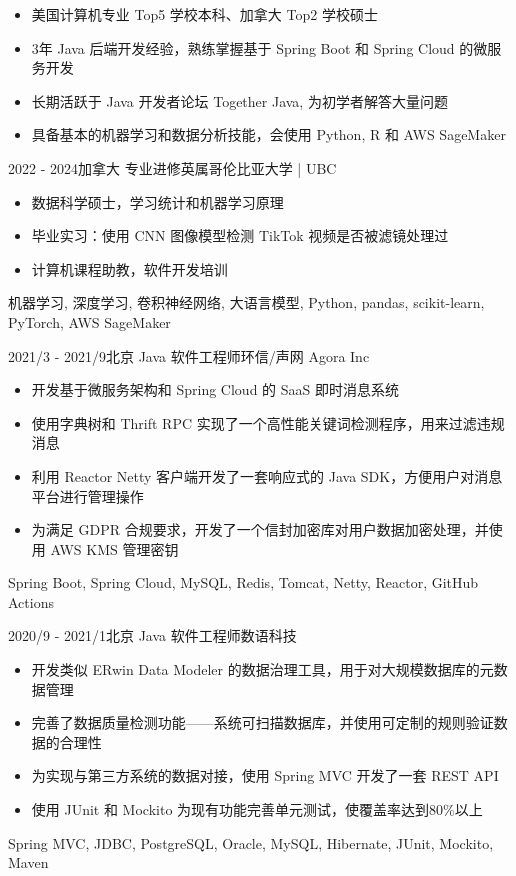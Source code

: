 \documentclass[alternative]{resume_template}
\begin{document}
\makecvheader

\begin{itemize}
    \item 美国计算机专业 Top5 学校本科、加拿大 Top2 学校硕士
    \item 3年 Java 后端开发经验，熟练掌握基于 Spring Boot 和 Spring Cloud 的微服务开发
    \item 长期活跃于 Java 开发者论坛 Together Java, 为初学者解答大量问题
    \item 具备基本的机器学习和数据分析技能，会使用 Python, R 和 AWS SageMaker
\end{itemize}

\begin{experiences}

    \experience
    {2022 - 2024}{加拿大}
    {专业进修}{英属哥伦比亚大学 | UBC}
    {
        \begin{itemize}
            \item 数据科学硕士，学习统计和机器学习原理
            \item 毕业实习：使用 CNN 图像模型检测 TikTok 视频是否被滤镜处理过
            \item 计算机课程助教，软件开发培训
        \end{itemize}
    }
    {机器学习, 深度学习, 卷积神经网络, 大语言模型, Python, pandas, scikit-learn, PyTorch, AWS SageMaker}

    \experience
    {2021/3 - 2021/9}{北京}
    {Java 软件工程师}{环信/声网 Agora Inc}
    {
        \begin{itemize}
            \item 开发基于微服务架构和 Spring Cloud 的 SaaS 即时消息系统
            \item 使用字典树和 Thrift RPC 实现了一个高性能关键词检测程序，用来过滤违规消息
            \item 利用 Reactor Netty 客户端开发了一套响应式的 Java SDK，方便用户对消息平台进行管理操作
            \item 为满足 GDPR 合规要求，开发了一个信封加密库对用户数据加密处理，并使用 AWS KMS 管理密钥
        \end{itemize}
    }
    {Spring Boot, Spring Cloud, MySQL, Redis, Tomcat, Netty, Reactor, GitHub Actions}

    \experience
    {2020/9 - 2021/1}{北京}
    {Java 软件工程师}{数语科技}
    {
        \begin{itemize}
            \item 开发类似 ERwin Data Modeler 的数据治理工具，用于对大规模数据库的元数据管理
            \item 完善了数据质量检测功能——系统可扫描数据库，并使用可定制的规则验证数据的合理性
            \item 为实现与第三方系统的数据对接，使用 Spring MVC 开发了一套 REST API
            \item 使用 JUnit 和 Mockito 为现有功能完善单元测试，使覆盖率达到80\%以上
        \end{itemize}
    }
    {Spring MVC, JDBC, PostgreSQL, Oracle, MySQL, Hibernate, JUnit, Mockito, Maven}


\end{experiences}
\end{document}
